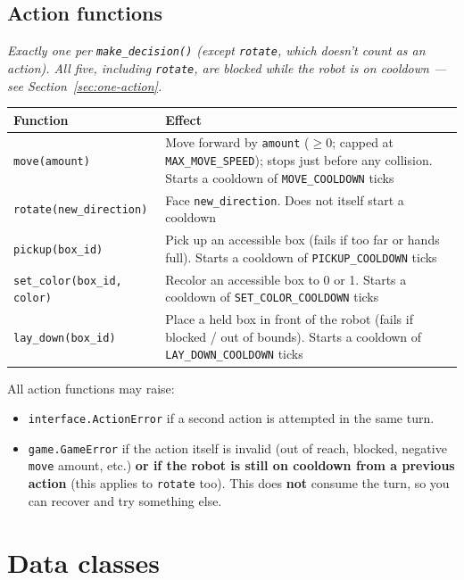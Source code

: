 \documentclass[11pt,a4paper]{article}
\newcommand{\code}[1]{\texttt{#1}}
\newcommand{\func}[1]{\texttt{#1}}
\begin{document}
\subsection{Action functions}
\emph{Exactly one per \func{make\_decision()} (except \func{rotate}, which
doesn't count as an action). All five, including \func{rotate}, are blocked
while the robot is on cooldown --- see Section~\ref{sec:one-action}.}

\begin{longtable}{p{6.7cm}p{8.3cm}}
\toprule
\textbf{Function} & \textbf{Effect} \\
\midrule
\endhead
\func{move(amount)} & Move forward by \code{amount} ($\geq 0$; capped at \code{MAX\_MOVE\_SPEED}); stops just before any collision. Starts a cooldown of \code{MOVE\_COOLDOWN} ticks \\
\func{rotate(new\_direction)} & Face \code{new\_direction}. Does not itself start a cooldown\\
\func{pickup(box\_id)} & Pick up an accessible box (fails if too far or hands full). Starts a cooldown of \code{PICKUP\_COOLDOWN} ticks \\
\func{set\_color(box\_id, color)} & Recolor an accessible box to 0 or 1. Starts a cooldown of \code{SET\_COLOR\_COOLDOWN} ticks \\
\func{lay\_down(box\_id)} & Place a held box in front of the robot (fails if blocked / out of bounds). Starts a cooldown of \code{LAY\_DOWN\_COOLDOWN} ticks \\
\bottomrule
\end{longtable}

All action functions may raise:
\begin{itemize}[nosep]
    \item \code{interface.ActionError} if a second action is attempted in
          the same turn.
    \item \code{game.GameError} if the action itself is invalid (out of
          reach, blocked, negative \func{move} amount, etc.) \textbf{or if
          the robot is still on cooldown from a previous action} (this
          applies to \func{rotate} too). This does \textbf{not} consume the
          turn, so you can recover and try something else.
\end{itemize}

\section{Data classes}
\end{document}
